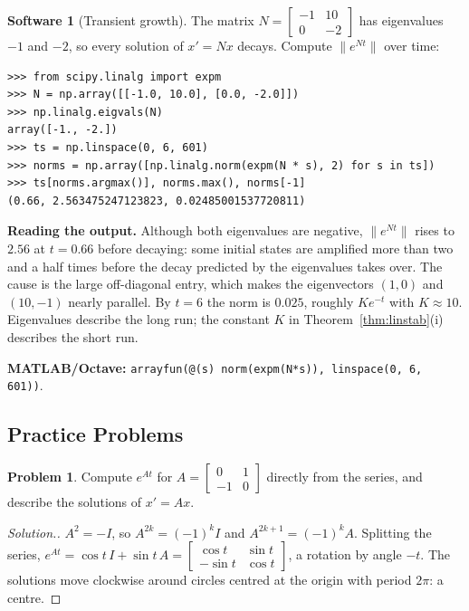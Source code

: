 \documentclass[11pt,a4paper]{article}
\numberwithin{equation}{section}
\theoremstyle{definition}
\newtheorem{software}[thm]{Software}
\newtheorem{problemx}{Problem}[subsection]
\newenvironment{problem}{\begin{problemx}}{\end{problemx}}
\newenvironment{solution}
  {\renewcommand{\qedsymbol}{}\begin{proof}[\textit{Solution}.]}
  {\end{proof}}
\begin{document}
\begin{software}[Transient growth]
\label{sw:transient}
The matrix $N = \begin{bmatrix} -1 & 10\\ 0 & -2\end{bmatrix}$ has eigenvalues $-1$ and $-2$, so every solution of $x' = Nx$ decays. Compute $\|e^{Nt}\|$ over time:
{\small\begin{verbatim}
>>> from scipy.linalg import expm
>>> N = np.array([[-1.0, 10.0], [0.0, -2.0]])
>>> np.linalg.eigvals(N)
array([-1., -2.])
>>> ts = np.linspace(0, 6, 601)
>>> norms = np.array([np.linalg.norm(expm(N * s), 2) for s in ts])
>>> ts[norms.argmax()], norms.max(), norms[-1]
(0.66, 2.563475247123823, 0.02485001537720811)
\end{verbatim}}
\textbf{Reading the output.} Although both eigenvalues are negative, $\|e^{Nt}\|$ rises to $2.56$ at $t = 0.66$ before decaying: some initial states are amplified more than two and a half times
before the decay predicted by the eigenvalues takes over. The cause is the large off-diagonal entry, which makes the eigenvectors $(1, 0)$ and $(10, -1)$ nearly parallel. By
$t = 6$ the norm is $0.025$, roughly $Ke^{-t}$ with $K \approx 10$. Eigenvalues describe the long run; the constant $K$ in Theorem~\ref{thm:linstab}(i) describes the short run.

\textbf{MATLAB/Octave:} \texttt{arrayfun(@(s) norm(expm(N*s)), linspace(0, 6, 601))}.
\end{software}

\subsection{Practice Problems}

\begin{problem}
Compute $e^{At}$ for $A = \begin{bmatrix} 0 & 1\\ -1 & 0\end{bmatrix}$ directly from the series, and describe the solutions of $x' = Ax$.
\end{problem}

\begin{solution}
$A^2 = -I$, so $A^{2k} = (-1)^kI$ and $A^{2k+1} = (-1)^kA$. Splitting the series, $e^{At} = \cos t\,I + \sin t\,A = \begin{bmatrix} \cos t & \sin t\\ -\sin t & \cos t\end{bmatrix}$, a rotation by angle $-t$. The solutions move
clockwise around circles centred at the origin with period $2\pi$: a centre.
\end{solution}
\end{document}

